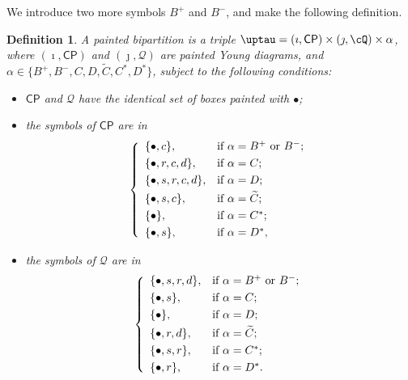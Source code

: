 \documentclass[12pt]{amsart}
\newcommand{\CP}{{\mathcal {P}}}
\numberwithin{equation}{section}
\newtheorem{defn}[thm]{Definition}
\theoremstyle{remark}
\def\CP{\mathsf{CP}}
\begin{document}
We introduce two more symbols $B^+$ and $B^-$, and make the following
definition.
\begin{defn} \label{def:pbp1}
  A painted bipartition is a triple
  $\uptau=(\imath, \CP)\times (\jmath, \cQ)\times \alpha$, where $(\imath, \CP)$
  and $ (\jmath, \mathcal Q)$ are painted Young diagrams, and
  $\alpha\in \{B^+,B^-, C,D,\widetilde {C}, C^*, D^*\}$, subject to the
  following conditions:
  \begin{itemize}
 \item $\CP$ and $\mathcal Q$ have the identical set of boxes painted with $\bullet$;
    \item the symbols of $\CP$ are in
          \[
          \left\{
          \begin{array}{ll}
            \{\bullet, c\}, &\hbox{if $\alpha=B^+$ or $B^-$}; \smallskip\\
            \{\bullet,  r, c,d\}, &\hbox{if $\alpha=C$}; \smallskip\\
            \{\bullet, s, r, c,d\}, &\hbox{if $\alpha=D$}; \smallskip\\
            \{\bullet, s, c\}, &\hbox{if $\alpha=\widetilde{ C}$}; \smallskip \\
            \{\bullet\}, &\hbox{if $\alpha=C^*$}; \smallskip \\
            \{\bullet, s\}, &\hbox{if $\alpha=D^*$},\\
          \end{array}
          \right.
          \]
    \item the symbols of $\mathcal Q$ are in           \[
          \left\{
          \begin{array}{ll}
            \{\bullet, s, r, d\}, &\hbox{if $\alpha=B^+$ or $B^-$}; \smallskip\\
            \{\bullet, s\}, &\hbox{if $\alpha=C$}; \smallskip\\
            \{\bullet\}, &\hbox{if $\alpha=D$}; \smallskip\\
            \{\bullet, r, d\}, &\hbox{if $\alpha=\widetilde{ C}$}; \smallskip\\
            \{\bullet, s,r\}, &\hbox{if $\alpha=C^*$}; \smallskip \\
            \{\bullet, r\}, &\hbox{if $\alpha=D^*$}.
          \end{array}
          \right.
          \]

  \end{itemize}
\end{defn}
\end{document}

